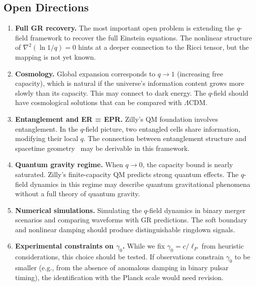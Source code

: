 \documentclass[aps,prd,twocolumn,showpacs,superscriptaddress,preprintnumbers]{revtex4-2}
\begin{document}
\subsection{Open Directions}

\begin{enumerate}
    \item \textbf{Full GR recovery.} The most important open problem is extending the $q$-field framework to recover the full Einstein equations. The nonlinear structure of $\nabla^2(\ln 1/q)=0$ hints at a deeper connection to the Ricci tensor, but the mapping is not yet known.

    \item \textbf{Cosmology.} Global expansion corresponds to $q\to1$ (increasing free capacity), which is natural if the universe's information content grows more slowly than its capacity. This may connect to dark energy. The $q$-field should have cosmological solutions that can be compared with $\Lambda$CDM.

    \item \textbf{Entanglement and ER = EPR.} Zilly's QM foundation involves entanglement. In the $q$-field picture, two entangled cells share information, modifying their local $q$. The connection between entanglement structure and spacetime geometry~\cite{Maldacena:2013je} may be derivable in this framework.

    \item \textbf{Quantum gravity regime.} When $q\to0$, the capacity bound is nearly saturated. Zilly's finite-capacity QM predicts strong quantum effects. The $q$-field dynamics in this regime may describe quantum gravitational phenomena without a full theory of quantum gravity.

    \item \textbf{Numerical simulations.} Simulating the $q$-field dynamics in binary merger scenarios and comparing waveforms with GR predictions. The soft boundary and nonlinear damping should produce distinguishable ringdown signals.

    \item \textbf{Experimental constraints on $\gamma_0$.} While we fix $\gamma_0=c/\ell_P$ from heuristic considerations, this choice should be tested. If observations constrain $\gamma_0$ to be smaller (e.g., from the absence of anomalous damping in binary pulsar timing), the identification with the Planck scale would need revision.
\end{enumerate}

\end{document}
